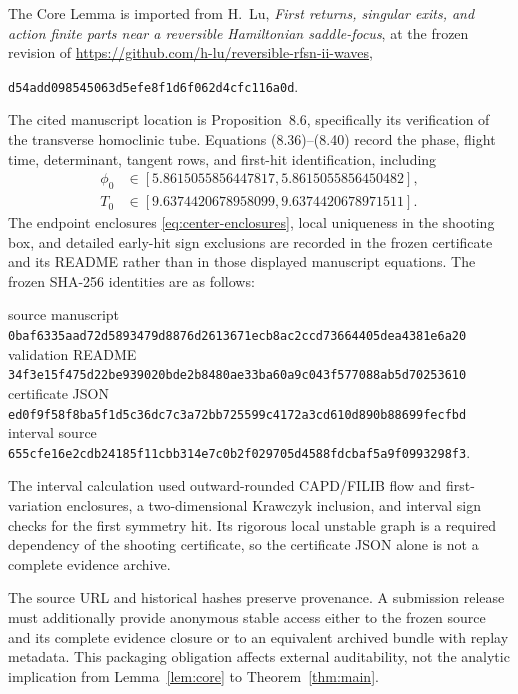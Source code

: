 \documentclass[11pt,reqno]{amsart}
\numberwithin{equation}{section}
\theoremstyle{remark}
\begin{document}
The Core Lemma is imported from H.~Lu, \emph{First returns, singular exits,
and action finite parts near a reversible Hamiltonian saddle-focus}, at the
frozen revision of
\url{https://github.com/h-lu/reversible-rfsn-ii-waves},
\begin{center}
\texttt{d54add098545063d5efe8f1d6f062d4cfc116a0d}.
\end{center}
The cited manuscript location is Proposition~8.6, specifically its
verification of the transverse homoclinic tube.  Equations (8.36)--(8.40)
record the phase, flight time, determinant, tangent rows, and first-hit
identification, including
\begin{equation}\label{eq:phase-time-enclosures}
 \begin{aligned}
 \phi_0&\in[5.8615055856447817,5.8615055856450482],\\
 T_0&\in[9.6374420678958099,9.6374420678971511].
 \end{aligned}
\end{equation}
The endpoint enclosures \eqref{eq:center-enclosures}, local uniqueness in the
shooting box, and detailed early-hit sign exclusions are recorded in the
frozen certificate and its README rather than in those displayed manuscript
equations.
The frozen SHA-256 identities are as follows:
\begin{center}
\small
source manuscript\\[-2pt]
\texttt{0baf6335aad72d5893479d8876d2613671ecb8ac2ccd73664405dea4381e6a20}\\[3pt]
validation README\\[-2pt]
\texttt{34f3e15f475d22be939020bde2b8480ae33ba60a9c043f577088ab5d70253610}\\[3pt]
certificate JSON\\[-2pt]
\texttt{ed0f9f58f8ba5f1d5c36dc7c3a72bb725599c4172a3cd610d890b88699fecfbd}\\[3pt]
interval source\\[-2pt]
\texttt{655cfe16e2cdb24185f11cbb314e7c0b2f029705d4588fdcbaf5a9f0993298f3}.
\end{center}
The interval calculation used outward-rounded CAPD/FILIB flow and
first-variation enclosures, a two-dimensional Krawczyk inclusion, and
interval sign checks for the first symmetry hit.  Its rigorous local unstable
graph is a required dependency of the shooting certificate, so the
certificate JSON alone is not a complete evidence archive.

The source URL and historical hashes preserve provenance.  A submission
release must additionally provide anonymous stable access either to the
frozen source and its complete evidence closure or to an equivalent archived
bundle with replay metadata.  This packaging obligation affects external
auditability, not the analytic implication from Lemma~\ref{lem:core} to
Theorem~\ref{thm:main}.



\end{document}
